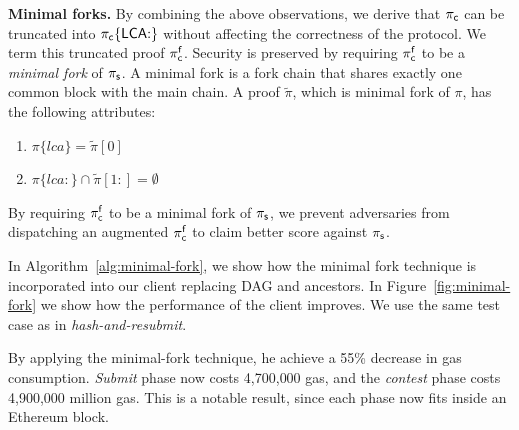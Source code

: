 \noindent \textbf{Minimal forks.} By combining the above observations, we
derive that $\mathsf{\pi_{c}}$ can be truncated into $\mathsf{\pi_{c}}\{\mathsf{LCA}{:}\}$ without affecting
the correctness of the protocol. We term this truncated proof $\mathsf{\pi_{c}^{f}}$.
Security is preserved by requiring $\mathsf{\pi_{c}^{f}}$ to be a \emph{minimal fork} of
$\mathsf{\pi_{s}}$. A minimal fork is a fork chain that shares exactly one common block
with the main chain. A proof $\tilde\pi$, which is minimal fork of $\pi$, has
the following attributes:

\begin{enumerate}
\item $\pi\{lca\} = \tilde\pi[0]$
\item $\pi\{lca{:}\} \cap \tilde\pi[1{:}] = \emptyset$
\end{enumerate}

By requiring $\mathsf{\pi_{c}^{f}}$ to be a minimal fork of $\mathsf{\pi_{s}}$, we prevent adversaries
from dispatching an augmented $\mathsf{\pi_{c}^{f}}$ to claim better score against $\mathsf{\pi_{s}}$.


In Algorithm~\ref{alg:minimal-fork}, we show how the minimal fork technique is
incorporated into our client replacing DAG and ancestors. In
Figure~\ref{fig:minimal-fork} we show how the performance of the client
improves. We use the same test case as in \emph{hash-and-resubmit}.

By applying the minimal-fork technique, he achieve a 55\% decrease in gas
consumption. \emph{Submit} phase now costs {4{,}700{,}000} gas, and
the \emph{contest} phase costs {4{,}900{,}000} million gas. This is a notable
result, since each phase now fits inside an Ethereum block.



